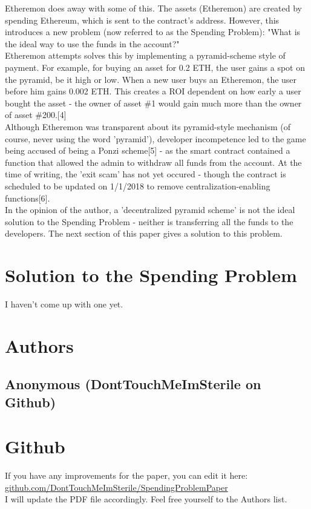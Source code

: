 \documentclass{article}
\begin{document}
Etheremon does away with some of this. The assets (Etheremon) are created by spending Ethereum, which is sent to the contract's address. However, this introduces a new problem (now referred to as the Spending Problem): "What is the ideal way to use the funds in the account?"
\\

Etheremon attempts solves this by implementing a pyramid-scheme style of payment. For example, for buying an asset for 0.2 ETH, the user gains a spot on the pyramid, be it high or low. When a new user buys an Etheremon, the user before him gains 0.002 ETH. This creates a ROI dependent on how early a user bought the asset - the owner of asset \#1 would gain much more than the owner of asset \#200.[4]
\\

Although Etheremon was transparent about its pyramid-style mechanism (of course, never using the word 'pyramid'), developer incompetence led to the game being accused of being a Ponzi scheme[5] - as the smart contract contained a function that allowed the admin to withdraw all funds from the account. At the time of writing, the 'exit scam' has not yet occured - though the contract is scheduled to be updated on 1/1/2018 to remove centralization-enabling functions[6]. 
\\

In the opinion of the author, a 'decentralized pyramid scheme' is not the ideal solution to the Spending Problem - neither is transferring all the funds to the developers. The next section of this paper gives a solution to this problem.
\\

\section{Solution to the Spending Problem}
I haven't come up with one yet. 
\newpage
\section{Authors}
\subsection{Anonymous (DontTouchMeImSterile on Github)}
\section{Github}
If you have any improvements for the paper, you can edit it here:\\                \url{github.com/DontTouchMeImSterile/SpendingProblemPaper}
\\
I will update the PDF file accordingly. Feel free yourself to the Authors list.
\end{document}
